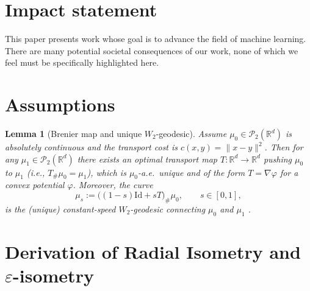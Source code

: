 \documentclass{article}
\theoremstyle{plain}
\newtheorem{lemma}[theorem]{Lemma}
\theoremstyle{definition}
\theoremstyle{remark}
\begin{document}


\section*{Impact statement}
This paper presents work whose goal is to advance the field of machine learning. There are many potential societal consequences of our work, none of which we feel must be specifically highlighted here.





\newpage
\appendix
\onecolumn

\section{Assumptions}
\begin{lemma}[Brenier map and unique $W_2$-geodesic]\label{lem:brenier_geodesic}
Assume $\mu_0 \in \mathcal{P}_2(\mathbb{R}^d)$ is absolutely continuous and the transport cost is
$c(x,y)=\|x-y\|^2$.
Then for any $\mu_1 \in \mathcal{P}_2(\mathbb{R}^d)$ there exists an optimal transport map
$T:\mathbb{R}^d\to\mathbb{R}^d$ pushing $\mu_0$ to $\mu_1$ (i.e., $T_{\#}\mu_0=\mu_1$), which is
$\mu_0$-a.e.\ unique and of the form $T=\nabla\varphi$ for a convex potential $\varphi$.
Moreover, the curve
\[
\mu_s := \big((1-s)\mathrm{Id}+sT\big)_{\#}\mu_0,\qquad s\in[0,1],
\]
is the (unique) constant-speed $W_2$-geodesic connecting $\mu_0$ and $\mu_1$ \citep{brenier1991polar,villani2008optimal}.
\end{lemma}

\section{Derivation of Radial Isometry and $\varepsilon$-isometry}\label{app:proofs_Iso}
\end{document}
